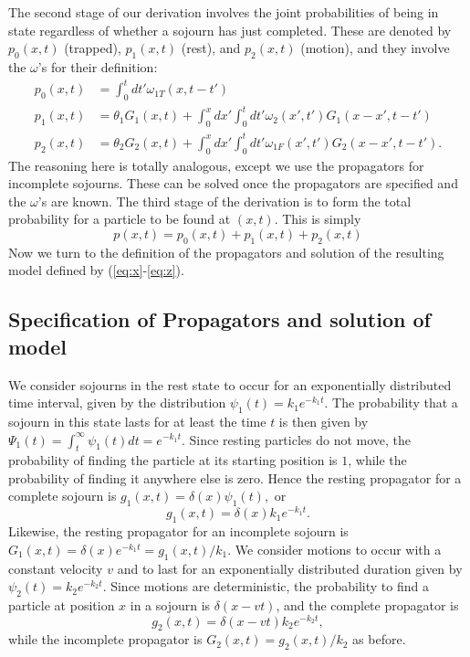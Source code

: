 \documentclass[]{agujournal2018}
\newcommand\be{\begin{equation}}
\newcommand\ee{\end{equation}}
\begin{document}
The second stage of our derivation involves the joint probabilities of being in state regardless of whether a sojourn has just completed. These are denoted by  $p_0(x,t)$ (trapped), $p_1(x,t)$ (rest), and $p_2(x,t)$ (motion), and they involve the $\omega$'s for their definition:
\begin{align}
p_0(x,t) &= \int_0^t dt' \omega_{1T}(x,t-t')\\
p_1(x,t) &= \theta_1 G_1(x,t) + \int_0^x dx' \int_0^t dt' \omega_2(x',t')G_1(x-x',t-t')\\
p_2(x,t) &= \theta_2 G_2(x,t) + \int_0^x dx' \int_0^t dt' \omega_{1F}(x',t')G_2(x-x',t-t').\label{eq:z}
\end{align}
The reasoning here is totally analogous, except we use the propagators for incomplete sojourns.
These can be solved once the propagators are specified and the $\omega$'s are known.
The third stage of the derivation is to form the total probability for a particle to be found at $(x,t)$.
This is simply 
\be p(x,t) = p_0(x,t) + p_1(x,t) + p_2(x,t)\ee
Now we turn to the definition of the propagators and solution of the resulting model defined by (\ref{eq:x}-\ref{eq:z}).


\subsection{Specification of Propagators and solution of model}
We consider sojourns in the rest state to occur for an exponentially distributed time interval, given by the distribution $\psi_1(t) = k_1 e^{-k_1t}.$
The probability that a sojourn in this state lasts for at least the time $t$ is then given by $\Psi_1(t) = \int_t^\infty \psi_1(t)dt = e^{-k_1 t}$.
Since resting particles do not move, the probability of finding the particle at its starting position is $1$, while the probability of finding it anywhere else is zero.
Hence the resting propagator for a complete sojourn is $g_1(x,t) = \delta(x)\psi_1(t),$ or 
\be g_1(x,t) = \delta(x)k_1e^{-k_1t}.\label{eq:prop1} \ee
Likewise, the resting propagator for an incomplete sojourn is $G_1(x,t) = \delta(x)e^{-k_1t} = g_1(x,t)/k_1.$
We consider motions to occur with a constant velocity $v$ and to last for an exponentially distributed duration given by $\psi_2(t) = k_2 e^{-k_2t}.$
Since motions are deterministic, the probability to find a particle at position $x$ in a sojourn is $\delta(x-vt)$, and the complete propagator is 
\be g_2(x,t) = \delta(x-vt)k_2e^{-k_2t},\label{eq:prop2}\ee
while the incomplete propagator is $G_2(x,t) = g_2(x,t)/k_2$ as before.
\end{document}
